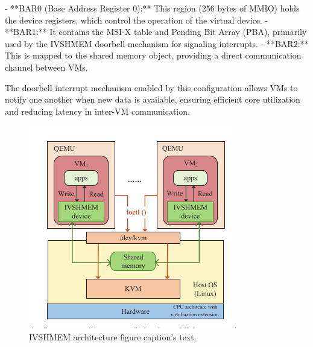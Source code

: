 \documentclass[letterpaper,twocolumn,10pt]{article}
\begin{document}
- **BAR0 (Base Address Register 0):** This region (256 bytes of MMIO) holds the device registers, which control the operation of the virtual device.
- **BAR1:** It contains the MSI-X table and Pending Bit Array (PBA), primarily used by the IVSHMEM doorbell mechanism for signaling interrupts.
- **BAR2:** This is mapped to the shared memory object, providing a direct communication channel between VMs.

The doorbell interrupt mechanism enabled by this configuration allows VMs to notify one another when new data is available, ensuring efficient core utilization and reducing latency in inter-VM communication.

\begin{figure}[ht]
\begin{center}
  \includegraphics[width=0.95\linewidth]{./figures/ivshmem_arch.png}
\end{center}
\caption{\label{fig:ivshmem_arch} IVSHMEM architecture figure 
  caption's text. }
\end{figure}
\end{document}
